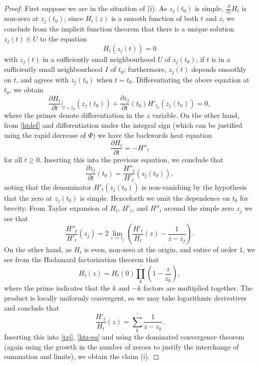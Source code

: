 \begin{proof}  First suppose we are in the situation of (i).  As $z_j(t_0)$ is simple, $\frac{\partial}{\partial z} H_t$ is non-zero at $z_j(t_0)$; since $H_t(z)$ is a smooth function of both $t$ and $z$, we conclude from the implicit function theorem that there is a unique solution $z_j(t) \in U$ to the equation
$$ H_t( z_j(t) ) = 0$$
with $z_j(t)$ in a sufficiently small neighbourhood $U$ of $z_j(t_0)$, if $t$ is in a sufficiently small neighbourhood $I$ of $t_0$; furthermore, $z_j(t)$ depends smoothly on $t$, and agrees with $z_j(t_0)$ when $t=t_0$.  Differentiating the above equation at $t_0$, we obtain
$$ \frac{\partial H_t}{\partial t}|_{t=t_0}( z_j(t_0) ) + \frac{\partial z_j}{\partial t}(t_0) H'_{t_0}(z_j(t_0)) = 0,$$
where the primes denote differentiation in the $z$ variable.
On the other hand, from \eqref{htdef} and differentiation under the integral sign (which can be justified using the rapid decrease of $\Phi$) we have the backwards heat equation
\begin{equation}\label{back}
\frac{\partial H_t}{\partial t} = -H''_t
\end{equation}
for all $t \geq 0$.  Inserting this into the previous equation, we conclude that
\begin{equation}\label{tzj}
\frac{\partial z_j}{\partial t}(t_0)  = \frac{H''_t}{H'_t}( z_j(t_0) ),
\end{equation}
noting that the denominator $H'_t(z_j(t_0))$ is non-vanishing by the hypothesis that the zero at $z_j(t_0)$ is simple.  Henceforth we omit the dependence on $t_0$ for brevity.  From Taylor expansion of $H_t$, $H'_t$, and $H''_t$ around the simple zero $z_j$ we see that
\begin{equation}\label{htz-eq}
 \frac{H''_t}{H'_t}( z_j) = 2 \lim_{z \to z_j}\left(  \frac{H'_t}{H_t}( z) - \frac{1}{z-z_j} \right).
\end{equation}
On the other hand, as $H_t$ is even, non-zero at the origin, and entire of order $1$, we see from the Hadamard factorization theorem that
$$ H_t(z) = H_t(0) \prod_k^{\prime} \left(1 - \frac{z}{z_k}\right),$$
where the prime indicates that the $k$ and $-k$ factors are multiplied together.  The product is locally uniformly convergent, so we may take logarithmic derivatives and conclude that
$$ \frac{H'_t}{H_t}(z) = \sum_k^{\prime} \frac{1}{z-z_k}.$$
Inserting this into \eqref{tzj}, \eqref{htz-eq} and using the dominated convergence theorem (again using the growth in the number of zeroes to justify the interchange of summation and limits), we obtain the claim (i).


\end{proof}
